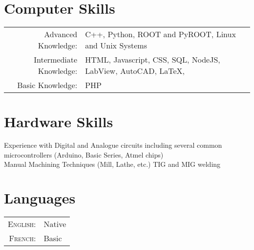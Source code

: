 \documentclass[a4paper,10pt]{article} %
\begin{document}
\section{Computer Skills}

\begin{tabular}{rl}

Advanced Knowledge: & C++, Python, ROOT and PyROOT, Linux and Unix Systems \\
Intermediate Knowledge: & HTML, Javascript, CSS, SQL, NodeJS, LabView, AutoCAD, \LaTeX, \\
Basic Knowledge:        & PHP
\end{tabular}


\section{Hardware Skills}

Experience with Digital and Analogue circuits including several common microcontrollers (Arduino, Basic Series, Atmel chips) \\
Manual Machining Techniques (Mill, Lathe, etc.) TIG and MIG welding\\



\section{Languages}

\begin{tabular}{rl}
\textsc{English:} & Native\\

\textsc{French:} & Basic \\
\end{tabular}

\newpage


\end{document}
